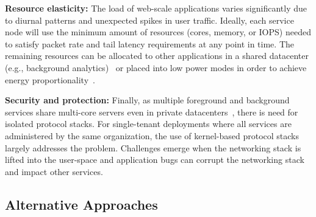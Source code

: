 {\bf Resource elasticity:} The load of web-scale applications varies
significantly due to diurnal patterns and unexpected spikes in user
traffic. Ideally, each service node will use the minimum amount of
resources (cores, memory, or IOPS) needed to satisfy packet rate and
tail latency requirements at any point in time. The remaining
resources can be allocated to other applications in a shared
datacenter (e.g., background
analytics)~\cite{Hindman:2011:MPF,DBLP:conf/asplos/DelimitrouK14,Leverich:RHSU:2014}
or placed into low power modes in order to achieve energy
proportionality~\cite{DBLP:journals/computer/BarrosoH07}.


{\bf Security and protection:} Finally, as multiple foreground and
background services share multi-core servers even in private
datacenters~\cite{Schwarzkopf:2013:OFS,DBLP:journals/cacm/DeanB13},
there is need for isolated protocol stacks. For single-tenant
deployments where all services are administered by the same
organization, the use of kernel-based protocol stacks largely
addresses the problem.  Challenges emerge when the networking stack is
lifted into the user-space and application bugs can corrupt the
networking stack and impact other services.


\subsection{Alternative Approaches}
\label{sec:motivation:current}

